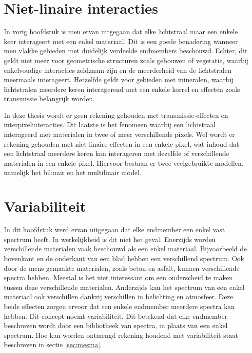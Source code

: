 \documentclass[12pt]{report}
\begin{document}
\section{Niet-linaire interacties}

In vorig hoofdstuk is men ervan uitgegaan dat elke lichtstraal maar een enkele keer interageert met een enkel materiaal. Dit is een goede benadering wanneer men vlakke gebieden met duidelijk verdeelde endmembers beschouwd. Echter, dit geldt niet meer voor geometrische structuren zoals gebouwen of vegetatie, waarbij enkelvoudige interacties zeldzaam zijn en de meerderheid van de lichtstralen meermaals interageert. Hetzelfde geldt voor gebieden met mineralen, waarbij lichtstralen meerdere keren interagerend met een enkele korrel en effecten zoals transmissie belangrijk worden.

In deze thesis wordt er geen rekening gehouden met transmissie-effecten en interpixelinteracties. Dit laatste is het fenomeen waarbij een lichtstraal interageerd met materialen in twee of meer verschillende pixels. Wel wordt er rekening gehouden met niet-linaire effecten in een enkele pixel, wat inhoud dat een lichtstraal meerdere keren kan interageren met dezelfde of verschillende materialen in een enkele pixel. Hiervoor bestaan er twee veelgebruikte modellen, namelijk het bilinair en het multilinair model.

\section{Variabiliteit}\label{sec:select}

In dit hoofdstuk werd ervan uitgegaan dat elke endmember een enkel vast spectrum heeft. In werkelijkheid is dit niet het geval. Enerzijds worden verschillende materialen vaak beschouwd als een enkel materiaal. Bijvoorbeeld de bovenkant en de onderkant van een blad hebben een verschillend spectrum. Ook door de mens gemaakte materialen, zoals beton en asfalt, kunnen verschillende spectra hebben. Meestal is het niet interessant om een onderscheid te maken tussen deze verschillende materialen. Anderzijds kan het spectrum van een enkel materiaal ook verschillen dankzij verschillen in belichting en atmosfeer. Deze beide effecten zorgen ervoor dat een enkele endmember meerdere spectra kan hebben. Dit concept noemt variabiliteit. Dit betekend dat elke endmember beschreven wordt door een bibliotheek van spectra, in plaats van een enkel spectrum. Hoe kan worden ontmengd rekening houdend met variabiliteit staat beschreven in sectie \ref{sec:mesma}. 
\end{document}
